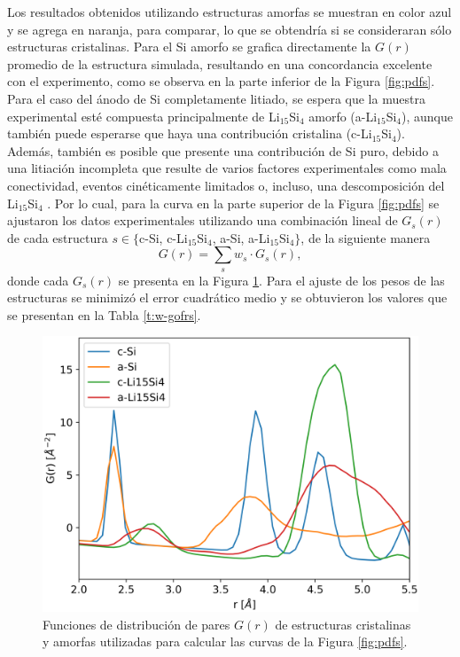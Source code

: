 Los resultados obtenidos utilizando estructuras amorfas se muestran en color azul 
y se agrega en naranja, para comparar, lo que se obtendría si se consideraran sólo
estructuras cristalinas. Para el Si amorfo se grafica directamente la $G(r)$ 
promedio de la estructura simulada, resultando en una concordancia excelente con 
el experimento, como se observa en la parte inferior de la Figura \ref{fig:pdfs}.
Para el caso del ánodo de Si completamente litiado, se espera que la muestra 
experimental esté compuesta principalmente de Li$_{15}$Si$_4$ amorfo 
(a-Li$_{15}$Si$_4$), aunque también puede esperarse que haya una contribución 
cristalina (c-Li$_{15}$Si$_4$). Además, también es posible que presente una 
contribución de Si puro, debido a una litiación incompleta que resulte de varios 
factores experimentales como mala conectividad, eventos cinéticamente limitados 
o, incluso, una descomposición del Li$_{15}$Si$_4$ \cite{key2009, key2011}. Por 
lo cual, para la curva en la parte superior de la Figura \ref{fig:pdfs} se 
ajustaron los datos experimentales utilizando una combinación lineal de $G_s(r)$ 
de cada estructura $s \in \lbrace$c-Si, c-Li$_{15}$Si$_4$, a-Si,
a-Li$_{15}$Si$_4\rbrace$, de la siguiente manera 
\begin{equation}\label{eq:contributions}
    G(r) = \sum_s w_s \cdot G_s(r),
\end{equation}
donde cada $G_s(r)$ se presenta en la Figura \ref{fig:gofrs}. Para el 
ajuste de los pesos de las estructuras se minimizó el error cuadrático 
medio y se obtuvieron los valores que se presentan en la Tabla 
\ref{t:w-gofrs}.
\begin{figure}[h!]
    \centering
    \includegraphics[width=.7\textwidth]{Silicio/prediccion/resultados/xray/gofrs.png}
    \caption{Funciones de distribución de pares $G(r)$ de estructuras 
    cristalinas y amorfas utilizadas para calcular las curvas de la Figura 
    \ref{fig:pdfs}.}
    \label{fig:gofrs}
\end{figure}
